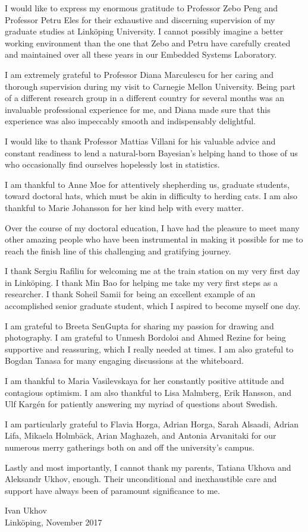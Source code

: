 I would like to express my enormous gratitude to Professor Zebo Peng and
Professor Petru Eles for their exhaustive and discerning supervision of my
graduate studies at Linköping University. I cannot possibly imagine a better
working environment than the one that Zebo and Petru have carefully created and
maintained over all these years in our Embedded Systems Laboratory.

I am extremely grateful to Professor Diana Marculescu for her caring and
thorough supervision during my visit to Carnegie Mellon University. Being part
of a different research group in a different country for several months was an
invaluable professional experience for me, and Diana made sure that this
experience was also impeccably smooth and indispensably delightful.

I would like to thank Professor Mattias Villani for his valuable advice and
constant readiness to lend a natural-born Bayesian's helping hand to those of us
who occasionally find ourselves hopelessly lost in statistics.

I am thankful to Anne Moe for attentively shepherding us, graduate students,
toward doctoral hats, which must be akin in difficulty to herding cats. I am
also thankful to Marie Johansson for her kind help with every matter.

Over the course of my doctoral education, I have had the pleasure to meet many
other amazing people who have been instrumental in making it possible for me to
reach the finish line of this challenging and gratifying journey.

I thank Sergiu Rafiliu for welcoming me at the train station on my very first
day in Linköping. I thank Min Bao for helping me take my very first steps as a
researcher. I thank Soheil Samii for being an excellent example of an
accomplished senior graduate student, which I aspired to become myself one day.

I am grateful to Breeta SenGupta for sharing my passion for drawing and
photography. I am grateful to Unmesh Bordoloi and Ahmed Rezine for being
supportive and reassuring, which I really needed at times. I am also grateful to
Bogdan Tanasa for many engaging discussions at the whiteboard.

I am thankful to Maria Vasilevskaya for her constantly positive attitude and
contagious optimism. I am also thankful to Lisa Malmberg, Erik Hansson, and Ulf
Kargén for patiently answering my myriad of questions about Swedish.

I am particularly grateful to Flavia Horga, Adrian Horga, Sarah Alsaadi, Adrian
Lifa, Mikaela Holmbäck, Arian Maghazeh, and Antonia Arvanitaki for our numerous
merry gatherings both on and off the university's campus.

Lastly and most importantly, I cannot thank my parents, Tatiana Ukhova and
Aleksandr Ukhov, enough. Their unconditional and inexhaustible care and support
have always been of paramount significance to me.

\vspace{4em}
\hfill
\noindent
\begin{minipage}{0.36\textwidth}
  Ivan Ukhov\\
  Linköping, November 2017
\end{minipage}
